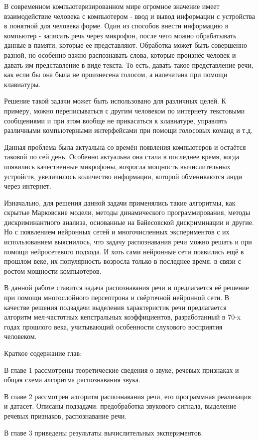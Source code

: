 В современном компьютеризированном мире огромное значение имеет взаимодействие человека с компьютером - ввод и вывод информации с устройства в понятной для человека форме. Один из способов внести информацию в компьютер - записать речь через микрофон, после чего можно обрабатывать данные в памяти, которые ее представляют. Обработка может быть совершенно разной, но особенно важно распознавать слова, которые произнёс человек и давать им представление в виде текста. То есть, давать такое представление речи, как если бы она была не произнесена голосом, а напечатана при помощи клавиатуры. 

Решение такой задачи может быть использовано для различных целей. К примеру, можно переписываться с другим человеком по интернету текстовыми сообщениями и при этом вообще не прикасаться к клавиатуре, управлять различными компьютерными интерфейсами при помощи голосовых команд и т.д.

Данная проблема была актуальна со времён появления компьютеров и остаётся таковой по сей день. Особенно актуальна она стала в последнее время, когда появились качественные микрофоны, возросла мощность вычислительных устройств, увеличилось количество информации, которой обмениваются люди через интернет.

Изначально, для решения данной задачи применялись такие алгоритмы, как скрытые Марковские модели, методы динамического программирования, методы дискриминантного анализа, основанные на Байесовской дискриминации и другие. Но с появлением нейронных сетей и многочисленных экспериментов с их использованием выяснилось, что задачу распознавания речи можно решать и при помощи нейросетевого подхода. И хоть сами нейронные сети появились ещё в прошлом веке, их популярность возросла только в последнее время, в связи с ростом мощности компьютеров.

В данной работе ставится задача распознавания речи и предлагается её решение при помощи многослойного персептрона и свёрточной нейронной сети. В качестве решения подзадачи выделения характеристик речи предлагается алгоритм мел-частотных кепстральных коэффициентов, разработанный в 70-x годах прошлого века, учитывающий особенности слухового восприятия человеком.

Краткое содержание глав:

В главе 1 рассмотрены теоретические сведения о звуке, речевых признаках и общая схема алгоритма распознавания звука. 
 
В главе 2 рассмотрен алгоритм распознавания речи, его программная реализация и датасет. Описаны подзадачи: предобработка звукового сигнала, выделение речевых признаков, распознавание речи.

В главе 3 приведены результаты вычислительных экспериментов.